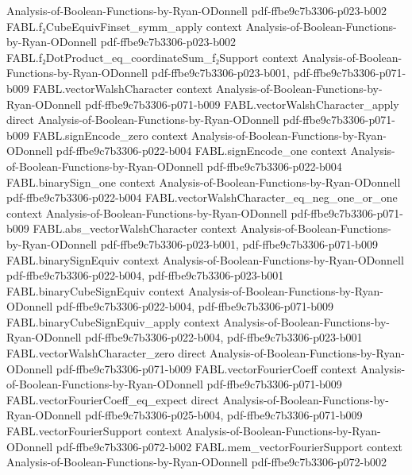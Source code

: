 \begin{theorem}
  {Analysis-of-Boolean-Functions-by-Ryan-ODonnell}
  {pdf-ffbe9c7b3306-p023-b002}
\proofstep
  {FABL.f₂CubeEquivFinset_symm_apply}
  {context}
  {Analysis-of-Boolean-Functions-by-Ryan-ODonnell}
  {pdf-ffbe9c7b3306-p023-b002}
\proofstep
  {FABL.f₂DotProduct_eq_coordinateSum_f₂Support}
  {context}
  {Analysis-of-Boolean-Functions-by-Ryan-ODonnell}
  {pdf-ffbe9c7b3306-p023-b001,
    pdf-ffbe9c7b3306-p071-b009}
\proofstep
  {FABL.vectorWalshCharacter}
  {context}
  {Analysis-of-Boolean-Functions-by-Ryan-ODonnell}
  {pdf-ffbe9c7b3306-p071-b009}
\proofstep
  {FABL.vectorWalshCharacter_apply}
  {direct}
  {Analysis-of-Boolean-Functions-by-Ryan-ODonnell}
  {pdf-ffbe9c7b3306-p071-b009}
\proofstep
  {FABL.signEncode_zero}
  {context}
  {Analysis-of-Boolean-Functions-by-Ryan-ODonnell}
  {pdf-ffbe9c7b3306-p022-b004}
\proofstep
  {FABL.signEncode_one}
  {context}
  {Analysis-of-Boolean-Functions-by-Ryan-ODonnell}
  {pdf-ffbe9c7b3306-p022-b004}
\proofstep
  {FABL.binarySign_one}
  {context}
  {Analysis-of-Boolean-Functions-by-Ryan-ODonnell}
  {pdf-ffbe9c7b3306-p022-b004}
\proofstep
  {FABL.vectorWalshCharacter_eq_neg_one_or_one}
  {context}
  {Analysis-of-Boolean-Functions-by-Ryan-ODonnell}
  {pdf-ffbe9c7b3306-p071-b009}
\proofstep
  {FABL.abs_vectorWalshCharacter}
  {context}
  {Analysis-of-Boolean-Functions-by-Ryan-ODonnell}
  {pdf-ffbe9c7b3306-p023-b001,
    pdf-ffbe9c7b3306-p071-b009}
\proofstep
  {FABL.binarySignEquiv}
  {context}
  {Analysis-of-Boolean-Functions-by-Ryan-ODonnell}
  {pdf-ffbe9c7b3306-p022-b004,
    pdf-ffbe9c7b3306-p023-b001}
\proofstep
  {FABL.binaryCubeSignEquiv}
  {context}
  {Analysis-of-Boolean-Functions-by-Ryan-ODonnell}
  {pdf-ffbe9c7b3306-p022-b004,
    pdf-ffbe9c7b3306-p071-b009}
\proofstep
  {FABL.binaryCubeSignEquiv_apply}
  {context}
  {Analysis-of-Boolean-Functions-by-Ryan-ODonnell}
  {pdf-ffbe9c7b3306-p022-b004,
    pdf-ffbe9c7b3306-p023-b001}
\proofstep
  {FABL.vectorWalshCharacter_zero}
  {direct}
  {Analysis-of-Boolean-Functions-by-Ryan-ODonnell}
  {pdf-ffbe9c7b3306-p071-b009}
\proofstep
  {FABL.vectorFourierCoeff}
  {context}
  {Analysis-of-Boolean-Functions-by-Ryan-ODonnell}
  {pdf-ffbe9c7b3306-p071-b009}
\proofstep
  {FABL.vectorFourierCoeff_eq_expect}
  {direct}
  {Analysis-of-Boolean-Functions-by-Ryan-ODonnell}
  {pdf-ffbe9c7b3306-p025-b004,
    pdf-ffbe9c7b3306-p071-b009}
\proofstep
  {FABL.vectorFourierSupport}
  {context}
  {Analysis-of-Boolean-Functions-by-Ryan-ODonnell}
  {pdf-ffbe9c7b3306-p072-b002}
\proofstep
  {FABL.mem_vectorFourierSupport}
  {context}
  {Analysis-of-Boolean-Functions-by-Ryan-ODonnell}
  {pdf-ffbe9c7b3306-p072-b002}

\end{theorem}
